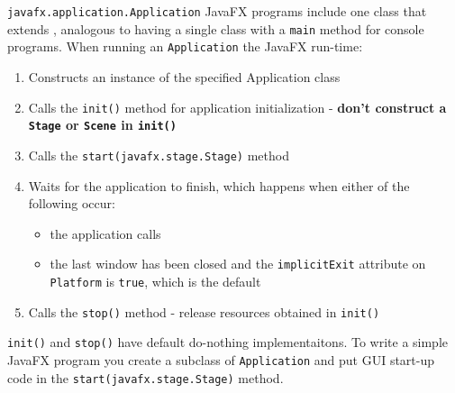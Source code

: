 \documentclass{beamer}
\begin{document}
\begin{frame}[fragile]{{\tt javafx.application.Application}}
\vspace{-.06in}
JavaFX programs include one class that extends , analogous to having a single class with a {\tt main} method for console programs.  When running an {\tt Application} the JavaFX run-time:
\vspace{-.03in}
\begin{enumerate}
  \item Constructs an instance of the specified Application class
\item Calls the {\tt init()} method for application initialization - {\bf don't construct a {\tt Stage} or {\tt Scene} in {\tt init()}}
\item Calls the {\tt start(javafx.stage.Stage)} method
\item Waits for the application to finish, which happens when either of the following occur:
\begin{itemize}
    \item the application calls 
    \item the last window has been closed and the {\tt implicitExit} attribute on {\tt Platform} is {\tt true}, which is the default
\end{itemize}
\item Calls the {\tt stop()} method - release resources obtained in {\tt init()}
\end{enumerate}

{\tt init()} and {\tt stop()} have default do-nothing implementaitons.  To write a simple JavaFX program you create a subclass of {\tt Application} and put GUI start-up code in the {\tt start(javafx.stage.Stage)} method.

\end{frame}
\end{document}
